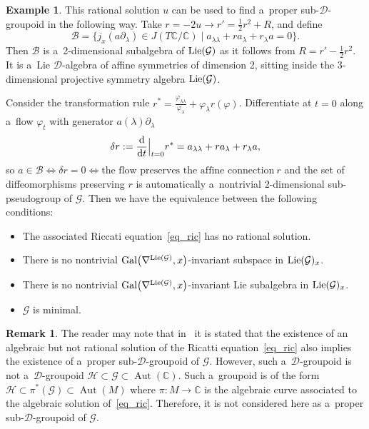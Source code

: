\documentclass[10pt,a4paper]{amsart}
\numberwithin{equation}{section}
\theoremstyle{definition}
\newtheorem{Example}[Theorem]{Example}
\newtheorem{Remark}[Theorem]{Remark}
\begin{document}
\begin{Example}
This rational solution $u$ can be used to find a~proper sub-$\mathcal D$-groupoid in the following way. Take $r = -2u \to r' = \frac{1}{2}r^2+R$, and define
\[\mathcal{B} = \{j_x (a \partial_\lambda) \in J(T\mathbb C/\mathbb C) \mid a_{\lambda\lambda}+ra_\lambda+r_\lambda a=0\}.
\]
Then $\mathcal{B}$ is a~2-dimensional subalgebra of ${\rm Lie}(\mathcal G)$ as it follows from $R = r'-\frac{1}{2}r^2$. It is a~Lie $\mathcal D$-algebra of affine symmetries of dimension 2, sitting inside the $3$-dimensional projective symmetry algebra ${\rm Lie}(\mathcal G)$.

Consider the transformation rule $r^*=\frac{\varphi_{\lambda\lambda}}{\varphi_\lambda}+\varphi_\lambda r(\varphi)$.
Differentiate at $t = 0$ along a~flow $\varphi_t$ with generator $a(\lambda)\partial_\lambda$
\[\delta r := \dfrac{\rm d}{{\rm d}t}\Big|_{t=0}r^* = a_{\lambda\lambda}+ra_\lambda+r_\lambda a,\]
so $a \in \mathcal{B} \Longleftrightarrow \delta r = 0 \Longleftrightarrow \text{the flow preserves the affine connection}\ r$ and the set of diffeomorphisms preserving $r$ is automatically a~nontrivial $2$-dimensional sub-pseudogroup of $\mathcal G$. Then we have the equivalence between the following conditions:
\begin{itemize}\itemsep=0pt
 \item[(i)] The associated Riccati equation~\eqref{eq_ric}
 has no rational solution.
 \item[(ii)] There is no nontrivial ${\rm Gal}\bigl(\nabla^{{\rm Lie}(\mathcal G)},x\bigr)$-invariant subspace in ${\rm Lie}(\mathcal G)_x$.
 \item[(iii)] There is no nontrivial ${\rm Gal}\bigl(\nabla^{{\rm Lie}(\mathcal G)},x\bigr)$-invariant Lie subalgebra in ${\rm Lie}(\mathcal G)_x$.
 \item[(iv)] $\mathcal G$ is minimal.
\end{itemize}
\end{Example}

\begin{Remark}
The reader may note that in~\cite[Proposition 3.6]{Casale_BlazquezSanz_ArenasTirado_2025} it is stated that the existence of an algebraic but not rational solution of the Ricatti equation~\eqref{eq_ric} also implies the existence of a~proper sub-$\mathcal D$-groupoid of $\mathcal G$. However, such a~$\mathcal D$-groupoid is not a~$\mathcal D$-groupoid $\mathcal H\subset\mathcal G\subset \operatorname{Aut}(\mathbb C)$. Such a~groupoid is of the form $\mathcal H\subset \pi^{*}(\mathcal G) \subset \operatorname{Aut}(M)$ where $\pi\colon M\to \mathbb C$ is the algebraic curve associated to the algebraic solution of~\eqref{eq_ric}. Therefore, it is not considered here as a~proper sub-$\mathcal D$-groupoid of $\mathcal G$.
\end{Remark}
\end{document}
